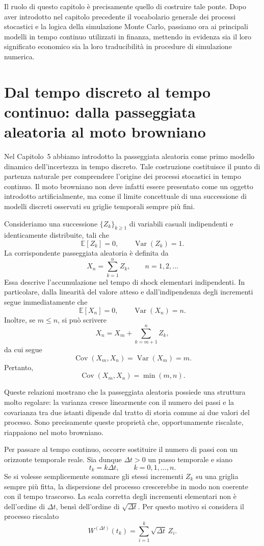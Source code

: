 Il ruolo di questo capitolo \`{e} precisamente quello di costruire tale
ponte. Dopo aver introdotto nel capitolo precedente il vocabolario
generale dei processi stocastici e la logica della simulazione Monte
Carlo, passiamo ora ai principali modelli in tempo continuo utilizzati in
finanza, mettendo in evidenza sia il loro significato economico sia la
loro traducibilit\`{a} in procedure di simulazione numerica.

\section{Dal tempo discreto al tempo continuo: dalla passeggiata aleatoria al moto browniano}

Nel Capitolo~5 abbiamo introdotto la passeggiata aleatoria come primo
modello dinamico dell'incertezza in tempo discreto. Tale costruzione
costituisce il punto di partenza naturale per comprendere l'origine dei
processi stocastici in tempo continuo. Il moto browniano non deve infatti
essere presentato come un oggetto introdotto artificialmente, ma come il
limite concettuale di una successione di modelli discreti osservati su
griglie temporali sempre pi\`u fini.

Consideriamo una successione $\{Z_k\}_{k\geq 1}$ di variabili casuali
indipendenti e identicamente distribuite, tali che
\[
\mathbb{E}[Z_k]=0,
\qquad
\operatorname{Var}(Z_k)=1.
\]
La corrispondente passeggiata aleatoria \`e definita da
\[
X_n=\sum_{k=1}^{n} Z_k,
\qquad
n=1,2,\ldots
\]
Essa descrive l'accumulazione nel tempo di shock elementari indipendenti.
In particolare, dalla linearit\`a del valore atteso e
dall'indipendenza degli incrementi segue immediatamente che
\[
\mathbb{E}[X_n]=0,
\qquad
\operatorname{Var}(X_n)=n.
\]
Inoltre, se $m\leq n$, si pu\`o scrivere
\[
X_n=X_m+\sum_{k=m+1}^{n} Z_k,
\]
da cui segue
\[
\operatorname{Cov}(X_m,X_n)=\operatorname{Var}(X_m)=m.
\]
Pertanto,
\[
\operatorname{Cov}(X_m,X_n)=\min(m,n).
\]

Queste relazioni mostrano che la passeggiata aleatoria possiede una
struttura molto regolare: la varianza cresce linearmente con il numero
dei passi e la covarianza tra due istanti dipende dal tratto di storia
comune ai due valori del processo. Sono precisamente queste propriet\`a
che, opportunamente riscalate, riappaiono nel moto browniano.

Per passare al tempo continuo, occorre sostituire il numero di passi con
un orizzonte temporale reale. Sia dunque $\Delta t>0$ un passo temporale
e siano
\[
t_k=k\Delta t,
\qquad
k=0,1,\ldots,n.
\]
Se si volesse semplicemente sommare gli stessi incrementi $Z_k$ su una
griglia sempre pi\`u fitta, la dispersione del processo crescerebbe in
modo non coerente con il tempo trascorso. La scala corretta degli
incrementi elementari non \`e dell'ordine di $\Delta t$, bens\`i
dell'ordine di $\sqrt{\Delta t}$. Per questo motivo si considera il
processo riscalato
\[
W^{(\Delta t)}(t_k)=\sum_{i=1}^{k}\sqrt{\Delta t}\,Z_i.
\]

